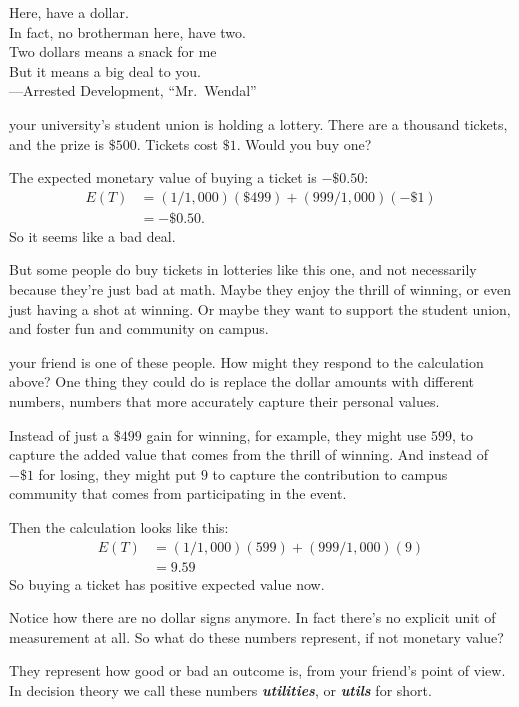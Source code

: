 \documentclass[justified]{tufte-book}
\newcommand{\E}{E}
\newenvironment{epigraph}%
{
\begin{flushright}    
\begin{minipage}{20em}
\begin{flushright}
\itshape
}%
{
\end{flushright}
\end{minipage}
\end{flushright}
}
\theoremstyle{definition}
\theoremstyle{definition}
\theoremstyle{definition}
\theoremstyle{remark}
\begin{document}
\begin{epigraph}
Here, have a dollar.\\
In fact, no brotherman here, have two.\\
Two dollars means a snack for me\\
But it means a big deal to you.\\
---Arrested Development, ``Mr.~Wendal''
\end{epigraph}

 your university's student union is holding a
lottery. There are a thousand tickets, and the prize is \(\$500\).
Tickets cost \(\$1\). Would you buy one?

The expected monetary value of buying a ticket is \(-\$0.50\): \[
  \begin{aligned}
    \E(T) &= (1/1,000)(\$499) + (999/1,000)(-\$1)\\
          &= -\$0.50.
  \end{aligned}
\] So it seems like a bad deal.

But some people do buy tickets in lotteries like this one, and not
necessarily because they're just bad at math. Maybe they enjoy the
thrill of winning, or even just having a shot at winning. Or maybe they
want to support the student union, and foster fun and community on
campus.

 your friend is one of these people. How might they
respond to the calculation above? One thing they could do is replace the
dollar amounts with different numbers, numbers that more accurately
capture their personal values.

Instead of just a \(\$499\) gain for winning, for example, they might
use \(599\), to capture the added value that comes from the thrill of
winning. And instead of \(-\$1\) for losing, they might put \(9\) to
capture the contribution to campus community that comes from
participating in the event.

Then the calculation looks like this: \[
  \begin{aligned}
    \E(T) &= (1/1,000)(599) + (999/1,000)(9)\\
          &= 9.59
  \end{aligned}
\] So buying a ticket has positive expected value now.

Notice how there are no dollar signs anymore. In fact there's no
explicit unit of measurement at all. So what do these numbers represent,
if not monetary value?

They represent how good or bad an outcome is, from your friend's point
of view. In decision theory we call these numbers
\textbf{\emph{utilities}}, or \textbf{\emph{utils}} for short.
\end{document}
